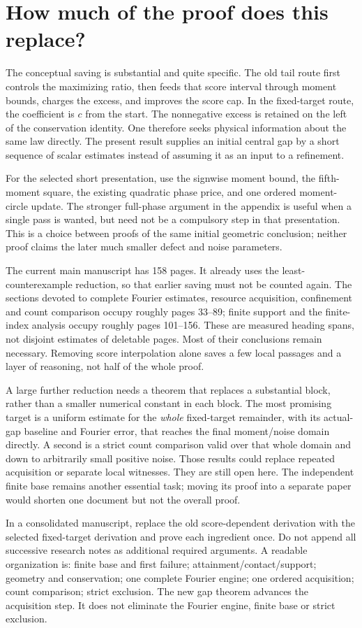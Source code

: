 \section{How much of the proof does this replace?}

The conceptual saving is substantial and quite specific. The old tail
route first controls the maximizing ratio, then feeds that score interval
through moment bounds, charges the excess, and improves the score cap.
In the fixed-target route, the coefficient is $c$ from the start. The
nonnegative excess is retained on the left of the conservation identity.
One therefore seeks physical information about the same law directly.
The present result supplies an initial central gap by a short sequence of
scalar estimates instead of assuming it as an input to a refinement.

For the selected short presentation, use the signwise moment bound, the
fifth-moment square, the existing quadratic phase price, and one ordered
moment-circle update. The stronger full-phase argument in the appendix
is useful when a single pass is wanted, but need not be a compulsory step
in that presentation. This is a choice between proofs of the same
initial geometric conclusion; neither proof claims the later much
smaller defect and noise parameters.

The current main manuscript has 158 pages. It already uses the
least-counterexample reduction, so that earlier saving must not be
counted again. The sections devoted to complete Fourier estimates,
resource acquisition, confinement and count comparison occupy roughly
pages 33--89; finite support and the finite-index analysis occupy roughly
pages 101--156. These are measured heading spans, not disjoint estimates
of deletable pages. Most of their conclusions remain necessary.
Removing score interpolation alone saves a few local passages and a
layer of reasoning, not half of the whole proof.

A large further reduction needs a theorem that replaces a substantial
block, rather than a smaller numerical constant in each block. The most
promising target is a uniform estimate for the \emph{whole} fixed-target
remainder, with its actual-gap baseline and Fourier error, that reaches
the final moment/noise domain directly. A second is a strict count
comparison valid over that whole domain and down to arbitrarily small
positive noise. Those results could replace repeated acquisition or
separate local witnesses. They are still open here. The independent
finite base remains another essential task; moving its proof into a
separate paper would shorten one document but not the overall proof.

In a consolidated manuscript, replace the old score-dependent derivation
with the selected fixed-target derivation and prove each ingredient once.
Do not append all successive research notes as additional required
arguments. A readable organization is: finite base and first failure;
attainment/contact/support; geometry and conservation; one complete
Fourier engine; one ordered acquisition; count comparison; strict
exclusion. The new gap theorem advances the acquisition step. It does
not eliminate the Fourier engine, finite base or strict exclusion.
